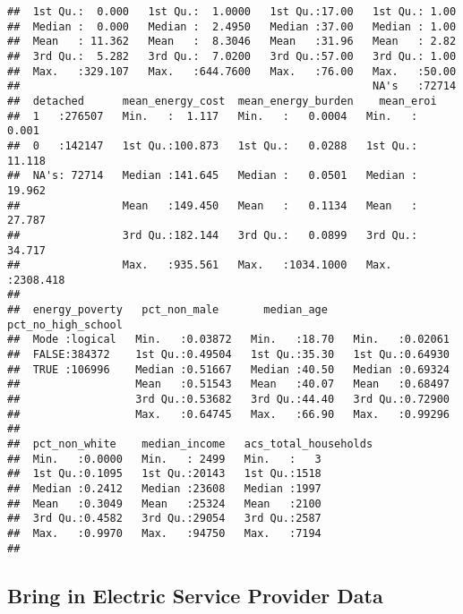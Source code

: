 \documentclass[]{article}
\begin{document}
\begin{verbatim}
##  1st Qu.:  0.000   1st Qu.:  1.0000   1st Qu.:17.00   1st Qu.: 1.00  
##  Median :  0.000   Median :  2.4950   Median :37.00   Median : 1.00  
##  Mean   : 11.362   Mean   :  8.3046   Mean   :31.96   Mean   : 2.82  
##  3rd Qu.:  5.282   3rd Qu.:  7.0200   3rd Qu.:57.00   3rd Qu.: 1.00  
##  Max.   :329.107   Max.   :644.7600   Max.   :76.00   Max.   :50.00  
##                                                       NA's   :72714  
##  detached      mean_energy_cost  mean_energy_burden    mean_eroi       
##  1   :276507   Min.   :  1.117   Min.   :   0.0004   Min.   :   0.001  
##  0   :142147   1st Qu.:100.873   1st Qu.:   0.0288   1st Qu.:  11.118  
##  NA's: 72714   Median :141.645   Median :   0.0501   Median :  19.962  
##                Mean   :149.450   Mean   :   0.1134   Mean   :  27.787  
##                3rd Qu.:182.144   3rd Qu.:   0.0899   3rd Qu.:  34.717  
##                Max.   :935.561   Max.   :1034.1000   Max.   :2308.418  
##                                                                        
##  energy_poverty   pct_non_male       median_age    pct_no_high_school
##  Mode :logical   Min.   :0.03872   Min.   :18.70   Min.   :0.02061   
##  FALSE:384372    1st Qu.:0.49504   1st Qu.:35.30   1st Qu.:0.64930   
##  TRUE :106996    Median :0.51667   Median :40.50   Median :0.69324   
##                  Mean   :0.51543   Mean   :40.07   Mean   :0.68497   
##                  3rd Qu.:0.53682   3rd Qu.:44.40   3rd Qu.:0.72900   
##                  Max.   :0.64745   Max.   :66.90   Max.   :0.99296   
##                                                                      
##  pct_non_white    median_income   acs_total_households
##  Min.   :0.0000   Min.   : 2499   Min.   :   3        
##  1st Qu.:0.1095   1st Qu.:20143   1st Qu.:1518        
##  Median :0.2412   Median :23608   Median :1997        
##  Mean   :0.3049   Mean   :25324   Mean   :2100        
##  3rd Qu.:0.4582   3rd Qu.:29054   3rd Qu.:2587        
##  Max.   :0.9970   Max.   :94750   Max.   :7194        
## 
\end{verbatim}

\hypertarget{bring-in-electric-service-provider-data}{%
\subsection{Bring in Electric Service Provider
Data}\label{bring-in-electric-service-provider-data}}
\end{document}
